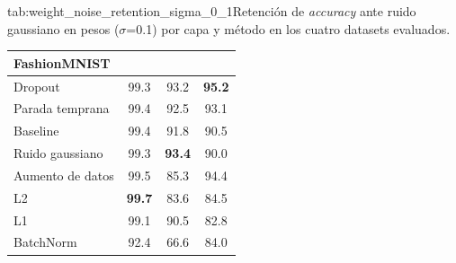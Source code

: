 \begin{table}{tab:weight_noise_retention_sigma_0_1}{Retención de \textit{accuracy} ante ruido gaussiano en pesos ($\sigma$=0.1) por capa y método en los cuatro datasets evaluados.}
\begin{tabular}{lccc}
\multicolumn{4}{l}{\textbf{FashionMNIST}}\\
\midrule
Dropout & 99.3 & 93.2 & \textbf{95.2} \\
Parada temprana & 99.4 & 92.5 & 93.1 \\
Baseline & 99.4 & 91.8 & 90.5 \\
Ruido gaussiano & 99.3 & \textbf{93.4} & 90.0 \\
Aumento de datos & 99.5 & 85.3 & 94.4 \\
L2 & \textbf{99.7} & 83.6 & 84.5 \\
L1 & 99.1 & 90.5 & 82.8 \\
BatchNorm & 92.4 & 66.6 & 84.0 \\
\bottomrule
\end{tabular}
\end{table}